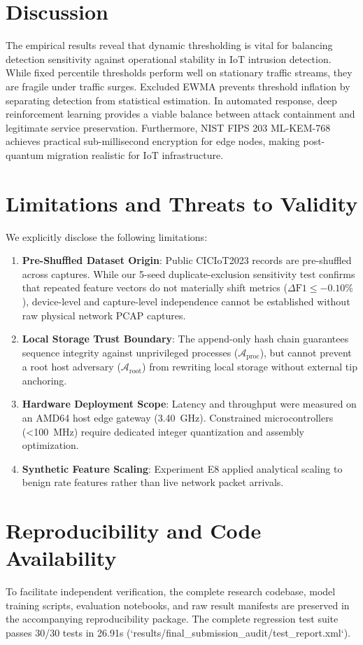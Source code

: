 \documentclass{ieeeaccess}
\begin{document}
\section{Discussion}
\label{sec:discussion}
The empirical results reveal that dynamic thresholding is vital for balancing detection sensitivity against operational stability in IoT intrusion detection. While fixed percentile thresholds perform well on stationary traffic streams, they are fragile under traffic surges. Excluded EWMA prevents threshold inflation by separating detection from statistical estimation. In automated response, deep reinforcement learning provides a viable balance between attack containment and legitimate service preservation. Furthermore, NIST FIPS 203 ML-KEM-768 achieves practical sub-millisecond encryption for edge nodes, making post-quantum migration realistic for IoT infrastructure.

\section{Limitations and Threats to Validity}
\label{sec:limitations}
We explicitly disclose the following limitations:
\begin{enumerate}
    \item \textbf{Pre-Shuffled Dataset Origin}: Public CICIoT2023 records are pre-shuffled across captures. While our 5-seed duplicate-exclusion sensitivity test confirms that repeated feature vectors do not materially shift metrics ($\Delta\text{F1} \le -0.10\%$), device-level and capture-level independence cannot be established without raw physical network PCAP captures.
    \item \textbf{Local Storage Trust Boundary}: The append-only hash chain guarantees sequence integrity against unprivileged processes ($\mathcal{A}_{\text{proc}}$), but cannot prevent a root host adversary ($\mathcal{A}_{\text{root}}$) from rewriting local storage without external tip anchoring.
    \item \textbf{Hardware Deployment Scope}: Latency and throughput were measured on an AMD64 host edge gateway (3.40~GHz). Constrained microcontrollers (<100~MHz) require dedicated integer quantization and assembly optimization.
    \item \textbf{Synthetic Feature Scaling}: Experiment E8 applied analytical scaling to benign rate features rather than live network packet arrivals.
\end{enumerate}

\section{Reproducibility and Code Availability}
\label{sec:reproducibility}
To facilitate independent verification, the complete research codebase, model training scripts, evaluation notebooks, and raw result manifests are preserved in the accompanying reproducibility package. The complete regression test suite passes 30/30 tests in 26.91s (`results/final_submission_audit/test_report.xml`).
\end{document}
